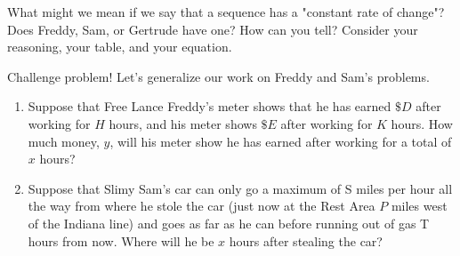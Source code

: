 \documentclass[nooutcomes, noauthor, handout]{ximera}
\begin{document}
\vfill

\begin{problem}
What might we mean if we say that a sequence has a "constant rate of change"? Does Freddy, Sam, or Gertrude have one? How can you tell? Consider your reasoning, your table, and your equation.
\end{problem}
 \vfill


\begin{problem} 
Challenge problem! Let's generalize our work on Freddy and Sam's problems.
\begin{enumerate}
    \item Suppose that Free Lance Freddy's meter shows that he has earned $\$D $ after working for $H$ hours, and his meter shows $\$E$ after working for $K $ hours. How much money, $y$, will his meter show he has earned after working for a total of $x$ hours?
    \item Suppose that Slimy Sam's car can only go a maximum of S miles per hour all the way from where he stole the car (just now at the Rest Area $P$ miles west of the Indiana line) and goes as far as he can before running out of gas T hours from now. Where will he be $x$ hours after stealing the car?

\end{enumerate}


\end{problem}
\end{document}
